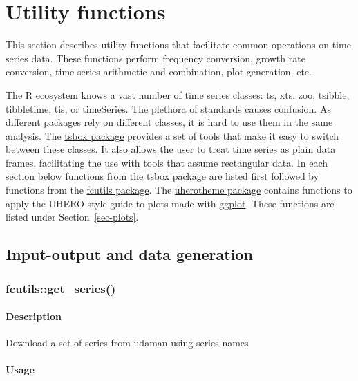 \documentclass[
  letterpaper,
  DIV=11,
  numbers=noendperiod]{scrreport}
\begin{document}

\chapter{Utility functions}\label{sec-utils}

This section describes utility functions that facilitate common
operations on time series data. These functions perform frequency
conversion, growth rate conversion, time series arithmetic and
combination, plot generation, etc.

The R ecosystem knows a vast number of time series classes: ts, xts,
zoo, tsibble, tibbletime, tis, or timeSeries. The plethora of standards
causes confusion. As different packages rely on different classes, it is
hard to use them in the same analysis. The
\href{https://docs.ropensci.org/tsbox/}{tsbox package} provides a set of
tools that make it easy to switch between these classes. It also allows
the user to treat time series as plain data frames, facilitating the use
with tools that assume rectangular data. In each section below functions
from the tsbox package are listed first followed by functions from the
\href{https://github.com/UHERO/fcutils}{fcutils package}. The
\href{https://github.com/uhero/uherotheme}{uherotheme package} contains
functions to apply the UHERO style guide to plots made with
\href{https://ggplot2.tidyverse.org/}{ggplot}. These functions are
listed under Section~\ref{sec-plots}.

\section{Input-output and data generation}\label{sec-io}

\subsection{fcutils::get\_series()}\label{fcutilsget_series}

\subsubsection{Description}\label{description}

Download a set of series from udaman using series names

\subsubsection{Usage}\label{usage}
\end{document}
